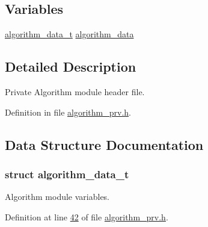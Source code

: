 \subsection*{Variables}
\begin{DoxyCompactItemize}
\item 
\hyperlink{a00016_d1/d84/a00097}{algorithm\+\_\+data\+\_\+t} \hyperlink{a00016_a183caa40cd01e79ee309cc9c4a225197}{algorithm\+\_\+data}
\end{DoxyCompactItemize}


\subsection{Detailed Description}
Private Algorithm module header file. 



Definition in file \hyperlink{a00016_source}{algorithm\+\_\+prv.\+h}.



\subsection{Data Structure Documentation}
\label{d1/d84/a00097}
\hypertarget{a00016_d1/d84/a00097}{}
\subsubsection{struct algorithm\+\_\+data\+\_\+t}
Algorithm module variables. 

Definition at line \hyperlink{a00016_source_l00042}{42} of file \hyperlink{a00016_source}{algorithm\+\_\+prv.\+h}.



